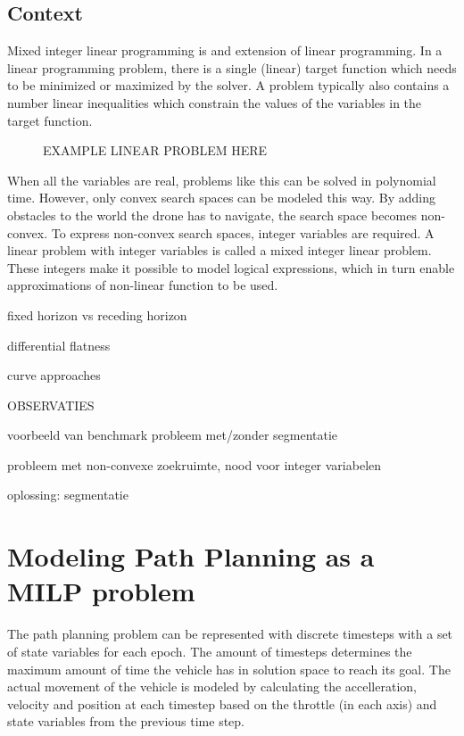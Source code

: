 \documentclass[12pt]{article}
\begin{document}
\subsection{Context}
\label{subsec:previous}
Mixed integer linear programming is and extension of linear programming. In a linear programming problem, there is a single (linear) target function which needs to be minimized or maximized by the solver. A problem typically also contains a number linear inequalities which constrain the values of the variables in the target function.
\begin{figure}[placement specifier]
EXAMPLE LINEAR PROBLEM HERE
\end{figure}
When all the variables are real, problems like this can be solved in polynomial time. However, only convex search spaces can be modeled this way. By adding obstacles to the world the drone has to navigate, the search space becomes non-convex. To express non-convex search spaces, integer variables are required\cite{Schouwenaars2001}. A linear problem with integer variables is called a mixed integer linear problem. These integers make it possible to model logical expressions, which in turn enable approximations of non-linear function to be used.
\par
fixed horizon vs receding horizon \cite{Bellingham2002}
\par
differential flatness \cite{Fliess1995a} \cite{Hao2005} \cite{Cowling2007} \cite{Mellinger2011}
\par
curve approaches \cite{Deits2015} \cite{Flores2007}


OBSERVATIES

voorbeeld van benchmark probleem met/zonder segmentatie

probleem met non-convexe zoekruimte, nood voor integer variabelen

oplossing: segmentatie


\section{Modeling Path Planning as a MILP problem}
\label{section:modeling}
The path planning problem can be represented with discrete timesteps with a set of state variables for each epoch. The amount of timesteps determines the maximum amount of time the vehicle has in solution space to reach its goal. The actual movement of the vehicle is modeled by calculating the accelleration, velocity and position at each timestep based on the throttle (in each axis) and state variables from the previous time step.
\end{document}
